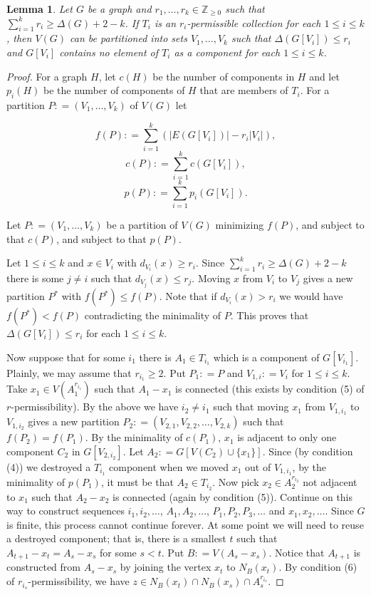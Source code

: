 \documentclass[12pt]{article}
\theoremstyle{plain}
\newtheorem{lem}[thm]{Lemma}
\theoremstyle{definition}
\theoremstyle{remark}
\newcommand{\DefinedAs}{\mathrel{\mathop:}=}
\begin{document}
\begin{lem}
Let $G$ be a graph and $r_1, \ldots, r_k \in \mathbb{Z}_{\geq 0}$ such that $\sum_{i=1}^k r_i \geq \Delta(G) + 2 - k$. If $T_i$ is an $r_i$-permissible collection for each $1 \leq i \leq k$, then $V(G)$ can be partitioned into sets $V_1, \ldots, V_k$ such that $\Delta(G[V_i]) \leq r_i$ and $G[V_i]$ contains no element of $T_i$ as a component for each $1 \leq i \leq k$.
\end{lem}
\begin{proof}
For a graph $H$, let $c(H)$ be the number of components in $H$ and let $p_i(H)$ be the number of components of $H$ that are members of $T_i$.  For a partition $P \DefinedAs (V_1, \ldots, V_k)$ of $V(G)$ let

\[f(P) \DefinedAs \sum_{i=1}^k \left(|E(G[V_i])| - r_i|V_i|\right),\]
\[c(P) \DefinedAs \sum_{i=1}^k c(G[V_i]),\]
\[p(P) \DefinedAs \sum_{i=1}^k p_i(G[V_i]).\]

\noindent Let $P \DefinedAs (V_1, \ldots, V_k)$ be a partition of $V(G)$ minimizing $f(P)$, and subject to that $c(P)$, and subject to that $p(P)$.

Let $1 \leq i \leq k$ and $x \in V_i$ with $d_{V_i}(x) \geq r_i$.  Since $\sum_{i=1}^k r_i \geq \Delta(G) + 2 - k$ there is some $j \neq i$ such that $d_{V_j}(x) \leq r_j$.  Moving $x$ from $V_i$ to $V_j$ gives a new partition $P^*$ with $f(P^*) \leq f(P)$.  Note that if $d_{V_i}(x) > r_i$ we would have $f(P^*) < f(P)$ contradicting the minimality of $P$. This proves that $\Delta(G[V_i]) \leq r_i$ for each $1 \leq i \leq k$.

Now suppose that for some $i_1$ there is $A_1 \in T_{i_1}$ which is a component of $G[V_{i_1}]$.  Plainly, we may assume that $r_{i_1} \geq 2$.  Put $P_1 \DefinedAs P$ and $V_{1,i} \DefinedAs V_i$ for $1 \leq i \leq k$. Take $x_1 \in V(A_1^{r_{i_1}})$ such that $A_1 - x_1$ is connected (this exists by condition (5) of $r$-permissibility).  By the above we have $i_2 \neq i_1$ such that moving $x_1$ from $V_{1, i_1}$ to $V_{1, i_2}$ gives a new partition $P_2 \DefinedAs (V_{2, 1}, V_{2,2}, \ldots, V_{2,k})$ such that $f(P_2) = f(P_1)$.  By the minimality of $c(P_1)$, $x_1$ is adjacent to only one component $C_2$ in $G[V_{2, i_2}]$. Let $A_2 \DefinedAs G[V(C_2) \cup \{x_1\}]$.  Since (by condition (4)) we destroyed a $T_{i_1}$ component when we moved $x_1$ out of $V_{1, i_1}$, by the minimality of $p(P_1)$, it must be that $A_2 \in T_{i_2}$. Now pick $x_2 \in A_2^{r_{i_2}}$ not adjacent to $x_1$ such that $A_2 - x_2$ is connected (again by condition (5)).  Continue on this way to construct sequences $i_1, i_2, \ldots$, $A_1, A_2, \ldots$, $P_1, P_2, P_3, \ldots$ and $x_1, x_2, \ldots$.  Since $G$ is finite, this process cannot continue forever.  At some point we will need to reuse a destroyed component; that is, there is a smallest $t$ such that $A_{t + 1} - x_t = A_s - x_s$ for some $s < t$.  Put $B \DefinedAs V(A_s - x_s)$.  Notice that $A_{t + 1}$ is constructed from $A_s - x_s$ by joining the vertex $x_t$ to $N_{B}(x_t)$.  By condition (6) of $r_{i_s}$-permissibility, we have $z \in N_{B}(x_t) \cap N_{B}(x_s) \cap A_s^{r_{i_s}}$.


\end{proof}
\end{document}
